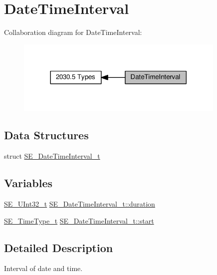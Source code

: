 \hypertarget{group__DateTimeInterval}{}\section{Date\+Time\+Interval}
\label{group__DateTimeInterval}
Collaboration diagram for Date\+Time\+Interval\+:\nopagebreak
\begin{figure}[H]
\begin{center}
\leavevmode
\includegraphics[width=284pt]{group__DateTimeInterval}
\end{center}
\end{figure}
\subsection*{Data Structures}
\begin{DoxyCompactItemize}
\item 
struct \hyperlink{structSE__DateTimeInterval__t}{S\+E\+\_\+\+Date\+Time\+Interval\+\_\+t}
\end{DoxyCompactItemize}
\subsection*{Variables}
\begin{DoxyCompactItemize}
\item 
\hyperlink{group__UInt32_ga70bd4ecda3c0c85d20779d685a270cdb}{S\+E\+\_\+\+U\+Int32\+\_\+t} \hyperlink{group__DateTimeInterval_ga9b65adb6654c23c32b85094c22950f1e}{S\+E\+\_\+\+Date\+Time\+Interval\+\_\+t\+::duration}
\item 
\hyperlink{group__TimeType_ga6fba87a5b57829b4ff3f0e7638156682}{S\+E\+\_\+\+Time\+Type\+\_\+t} \hyperlink{group__DateTimeInterval_gae3e78948c4059126d70ce13ffe67106c}{S\+E\+\_\+\+Date\+Time\+Interval\+\_\+t\+::start}
\end{DoxyCompactItemize}


\subsection{Detailed Description}
Interval of date and time. 

